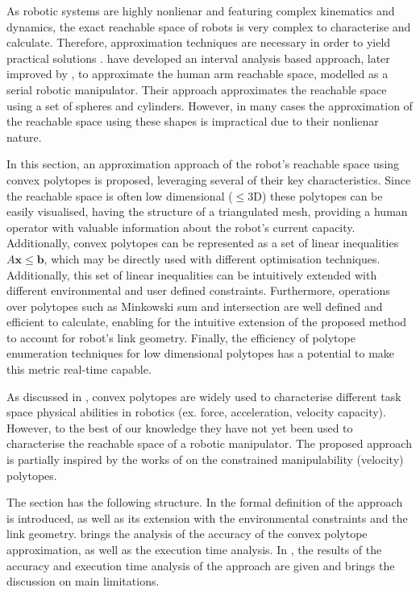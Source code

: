 As robotic systems are highly nonlienar and featuring complex kinematics and dynamics, the exact reachable space of robots is very complex to characterise and calculate.  Therefore, approximation techniques are necessary in order to yield practical solutions \cite{Althoff2021SetBased}. \citet{pereira2017} have developed an interval analysis based approach, later improved by \citet{schepp2022}, to approximate the human arm reachable space, modelled as a serial robotic manipulator. Their approach approximates the reachable space using a set of spheres and cylinders. However, in many cases the approximation of the reachable space using these shapes is impractical due to their nonlienar nature. 

In this section, an approximation approach of the robot's reachable space using convex polytopes is proposed, leveraging several of their key characteristics. Since the reachable space is often low dimensional ($\leq$3D) these polytopes can be easily visualised, having the structure of a triangulated mesh, providing a human operator with valuable information about the robot's current capacity. Additionally, convex polytopes can be represented as a set of linear inequalities $A\bm{x}\leq\bm{b}$, which may be directly used with different optimisation techniques. Additionally, this set of linear inequalities can be intuitively extended with different environmental and user defined constraints. Furthermore, operations over polytopes such as Minkowski sum and intersection are well defined and efficient to calculate, enabling for the intuitive extension of the proposed method to account for robot's link geometry. Finally, the efficiency of polytope enumeration techniques for low dimensional polytopes has a potential to make this metric real-time capable. 

As discussed in , convex polytopes are widely used to characterise different task space physical abilities in robotics (ex. force, acceleration, velocity capacity). However, to the best of our knowledge they have not yet been used to characterise the reachable space of a robotic manipulator. The proposed approach is partially inspired by the works of \citet{Long2018Evaluating} on the constrained manipulability (velocity) polytopes.  

The section has the following structure. In  the formal definition of the approach is introduced, as well as its extension with the environmental constraints and the link geometry.  brings the analysis of the accuracy of the convex polytope approximation, as well as the execution time analysis. In , the results of the accuracy and execution time analysis of the approach are given and  brings the discussion on main limitations.


